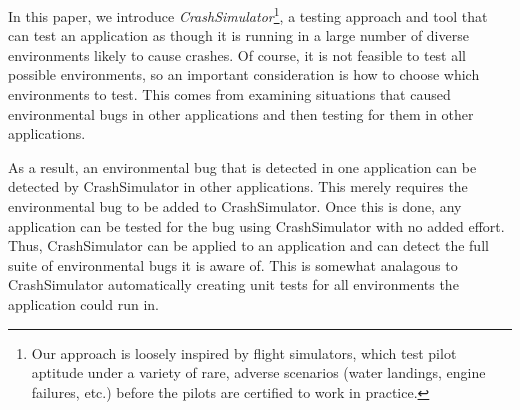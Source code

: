 
%
%

In this paper, we introduce {\em CrashSimulator}\footnote{
Our approach is loosely inspired by flight simulators, which test pilot
aptitude under a variety of rare, adverse scenarios (water landings, 
engine failures, etc.) before the pilots are certified to work in practice.}, 
a testing approach
and tool that can test an application as though it is running in a large number
of diverse environments likely to cause crashes.  Of course, it is not 
feasible to test all possible environments, so an important consideration
is how to choose which environments to test.  This comes from examining 
situations that caused environmental bugs in other applications and then
testing for them in other applications.

As a result, an environmental bug that is detected in one application can be 
detected by CrashSimulator in other applications.  This merely requires the 
environmental bug to be added to CrashSimulator. Once this is done, any application can
be tested for the bug using CrashSimulator with no added effort.  Thus,
CrashSimulator can be applied to an application and can detect the full 
suite of environmental bugs it is aware of.  This is somewhat analagous to
CrashSimulator automatically creating unit tests for all environments the 
application could run in.


